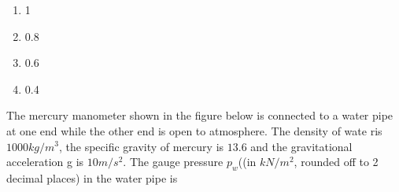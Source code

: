 \begin{multicols}{2}
    \begin{enumerate}
        \item 1
        \item 0.8
        \item 0.6
        \item 0.4
    \end{enumerate}
\end{multicols}
\item The mercury manometer shown in the figure below is connected to a water pipe at one end while the other end is open to atmosphere. The density of wate ris $1000kg/m^3$, the specific gravity of mercury is $13.6$ and the gravitational acceleration g is $10m/s^2$. The gauge pressure $p_w$((in $kN/m^2$, rounded off to 2 decimal places) in the water pipe is  \underline{\hspace{1cm}} 
